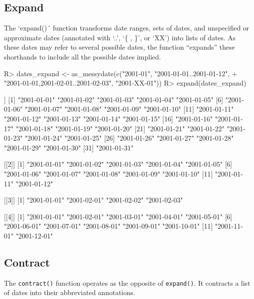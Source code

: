 \documentclass[
]{jss}
\begin{document}
\hypertarget{expand}{%
\subsection{Expand}\label{expand}}

The `expand()´ function transforms date ranges, sets of dates, and
unspecified or approximate dates (annotated with `..', `\{ , \}', or
`XX') into lists of dates. As these dates may refer to several possible
dates, the function ``expands'' these shorthands to include all the
possible dates implied.

\begin{CodeChunk}
\begin{CodeInput}
R> dates_expand <- as_messydate(c("2001-01", "2001-01-01..2001-01-12",
+                                "{2001-01-01,2001-02-01..2001-02-03}", "2001-XX-01"))
R> expand(dates_expand)
\end{CodeInput}
\begin{CodeOutput}
[[1]]
 [1] "2001-01-01" "2001-01-02" "2001-01-03" "2001-01-04" "2001-01-05"
 [6] "2001-01-06" "2001-01-07" "2001-01-08" "2001-01-09" "2001-01-10"
[11] "2001-01-11" "2001-01-12" "2001-01-13" "2001-01-14" "2001-01-15"
[16] "2001-01-16" "2001-01-17" "2001-01-18" "2001-01-19" "2001-01-20"
[21] "2001-01-21" "2001-01-22" "2001-01-23" "2001-01-24" "2001-01-25"
[26] "2001-01-26" "2001-01-27" "2001-01-28" "2001-01-29" "2001-01-30"
[31] "2001-01-31"

[[2]]
 [1] "2001-01-01" "2001-01-02" "2001-01-03" "2001-01-04" "2001-01-05"
 [6] "2001-01-06" "2001-01-07" "2001-01-08" "2001-01-09" "2001-01-10"
[11] "2001-01-11" "2001-01-12"

[[3]]
[1] "2001-01-01" "2001-02-01" "2001-02-02" "2001-02-03"

[[4]]
 [1] "2001-01-01" "2001-02-01" "2001-03-01" "2001-04-01" "2001-05-01"
 [6] "2001-06-01" "2001-07-01" "2001-08-01" "2001-09-01" "2001-10-01"
[11] "2001-11-01" "2001-12-01"
\end{CodeOutput}
\end{CodeChunk}

\hypertarget{contract}{%
\subsection{Contract}\label{contract}}

The \texttt{contract()} function operates as the opposite of
\texttt{expand()}. It contracts a list of dates into their abbreviated
annotations.
\end{document}
